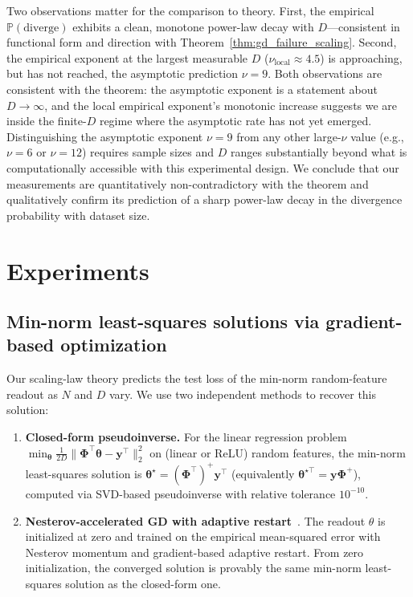 \documentclass[11pt]{article}
\theoremstyle{plain}
\theoremstyle{definition}
\theoremstyle{remark}
\newcommand{\JSCheck}[1]{#1}
\begin{document}
\JSCheck{Two observations matter for the comparison to theory. First, the empirical $\mathbb{P}(\mathrm{diverge})$ exhibits a clean, monotone power-law decay with $D$---consistent in functional form and direction with Theorem~\ref{thm:gd_failure_scaling}. Second, the empirical exponent at the largest measurable $D$ ($\nu_{\mathrm{local}} \approx 4.5$) is approaching, but has not reached, the asymptotic prediction $\nu = 9$. Both observations are consistent with the theorem: the asymptotic exponent is a statement about $D \to \infty$, and the local empirical exponent's monotonic increase suggests we are inside the finite-$D$ regime where the asymptotic rate has not yet emerged. Distinguishing the asymptotic exponent $\nu = 9$ from any other large-$\nu$ value (e.g., $\nu = 6$ or $\nu = 12$) requires sample sizes and $D$ ranges substantially beyond what is computationally accessible with this experimental design. We conclude that our measurements are quantitatively non-contradictory with the theorem and qualitatively confirm its prediction of a sharp power-law decay in the divergence probability with dataset size.}


\section{\JSCheck{Experiments}}\label{app:training}



\subsection{Min-norm least-squares solutions via gradient-based optimization}




Our scaling-law theory predicts the test loss of the min-norm random-feature readout as $N$ and $D$ vary. We use two independent methods to recover this solution:
\begin{enumerate}[leftmargin=*,topsep=0pt]
    \item \textbf{Closed-form pseudoinverse.} For the linear regression problem $\min_{\boldsymbol{\theta}} \tfrac{1}{2D}\|\boldsymbol{\Phi}^\top\boldsymbol{\theta}-\mathbf{y}^\top\|_2^2$ on (linear or ReLU) random features, the min-norm least-squares solution is $\boldsymbol{\theta}^\star=(\boldsymbol{\Phi}^\top)^+\mathbf{y}^\top$ (equivalently $\boldsymbol{\theta}^{\star\top}=\mathbf{y}\boldsymbol{\Phi}^+$), computed via SVD-based pseudoinverse with relative tolerance $10^{-10}$.
    
    \item \textbf{Nesterov-accelerated GD with adaptive restart}~\citep{nesterov1983method,odonoghue2015adaptive}. The readout $\theta$ is initialized at zero and trained on the empirical mean-squared error with Nesterov momentum and gradient-based adaptive restart. From zero initialization, the converged solution is provably the same min-norm least-squares solution as the closed-form one.
\end{enumerate}
\end{document}
